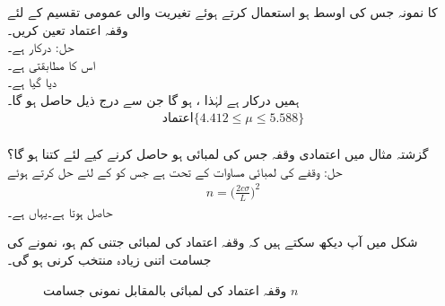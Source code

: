   کا نمونہ جس کی اوسط  ہو استعمال کرتے ہوئے تغیریت  والی عمومی تقسیم کے لئے  وقفہ اعتماد تعین کریں۔\\
حل:\quad {} \quad
{} درکار ہے۔\\ 
 \quad
اس کا مطابقتی  ہے۔\\
 \quad
{} دیا گیا ہے۔\\
\quad
ہمیں  درکار ہے لہٰذا ،  ہو گا جن سے درج ذیل حاصل ہو گا۔
\begin{align*}
\text{اعتماد} \{ 4.412\le \mu \le 5.588\}
\end{align*}
\quad {}\\
گزشتہ مثال میں  اعتمادی وقفہ جس کی لمبائی  ہو حاصل کرنے کیے لئے  کتنا ہو گا؟\\
حل:\quad
وقفے کی لمبائی مساوات  کے تحت  ہے جس کو  کے لئے حل کرتے ہوئے  
\begin{align*}
n=\big(\frac{2c\sigma}{L}\big)^2
\end{align*}
حاصل ہوتا ہے۔یہاں  ہے۔

شکل  میں آپ دیکھ سکتے ہیں کہ وقفہ اعتماد کی لمبائی  جتنی کم ہو، نمونے کی جسامت  اتنی زیادہ منتخب کرنی ہو گی۔
\begin{figure}
\centering
{}
\caption{وقفہ اعتماد کی لمبائی  بالمقابل نمونی جسامت $n$}
\label{شکل_شماریات_وقفہ_لمبائی_بالمقابل_جسامت}
\end{figure}

